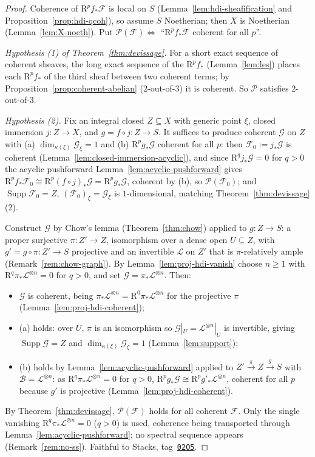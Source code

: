 \documentclass[11pt]{report}
\theoremstyle{plain}
\theoremstyle{definition}
\newcommand{\Supp}{\operatorname{Supp}}
\newcommand{\Ff}{\mathcal{F}}
\newcommand{\Gg}{\mathcal{G}}
\newcommand{\Ll}{\mathcal{L}}
\newcommand{\Bb}{\mathcal{B}}
\newcommand{\kk}{\kappa}
\newcommand{\Rr}{\mathrm{R}}
\newcommand{\stacks}[1]{\href{https://stacks.math.columbia.edu/tag/#1}{\texttt{#1}}}
\begin{document}
\begin{proof}
Coherence of $\Rr^p f_*\Ff$ is local on $S$ (Lemma~\ref{lem:hdi-sheafification}
and Proposition~\ref{prop:hdi-qcoh}), so assume $S$ Noetherian; then $X$ is
Noetherian (Lemma~\ref{lem:X-noeth}). Put
$\mathcal P(\Ff)\Leftrightarrow$ ``$\Rr^p f_*\Ff$ coherent for all $p$''.

\emph{Hypothesis (1) of Theorem~\ref{thm:devissage}.} For a short exact
sequence of coherent sheaves, the long exact sequence of the $\Rr^p f_*$
(Lemma~\ref{lem:les}) places each $\Rr^p f_*$ of the third sheaf between two
coherent terms; by Proposition~\ref{prop:coherent-abelian} (2-out-of-3) it is
coherent. So $\mathcal P$ satisfies 2-out-of-3.

\emph{Hypothesis (2).} Fix an integral closed $Z\subseteq X$ with generic
point $\xi$, closed immersion $j\colon Z\to X$, and $g=f\circ j\colon Z\to S$.
It suffices to produce coherent $\Gg$ on $Z$ with (a) $\dim_{\kk(\xi)}\Gg_\xi
=1$ and (b) $\Rr^p g_*\Gg$ coherent for all $p$: then $\Ff_0:=j_*\Gg$ is
coherent (Lemma~\ref{lem:closed-immersion-acyclic}), and since
$\Rr^q j_*\Gg=0$ for $q>0$ the acyclic pushforward
Lemma~\ref{lem:acyclic-pushforward} gives
$\Rr^p f_*\Ff_0\cong\Rr^p(f\circ j)_*\Gg=\Rr^p g_*\Gg$, coherent by (b), so
$\mathcal P(\Ff_0)$; and $\Supp\Ff_0=Z$, $(\Ff_0)_\xi=\Gg_\xi$ is
$1$-dimensional, matching Theorem~\ref{thm:devissage}(2).

Construct $\Gg$ by Chow's lemma (Theorem~\ref{thm:chow}) applied to
$g\colon Z\to S$: a proper surjective $\pi\colon Z'\to Z$, isomorphism over a
dense open $U\subseteq Z$, with $g'=g\circ\pi\colon Z'\to S$ projective and an
invertible $\Ll$ on $Z'$ that is $\pi$-relatively ample
(Remark~\ref{rem:chow-graph}). By Lemma~\ref{lem:proj-hdi-vanish} choose
$n\ge1$ with $\Rr^q\pi_*\Ll^{\otimes n}=0$ for $q>0$, and set
$\Gg=\pi_*\Ll^{\otimes n}$. Then:
\begin{itemize}
\item $\Gg$ is coherent, being $\pi_*\Ll^{\otimes n}=\Rr^0\pi_*\Ll^{\otimes n}$
for the projective $\pi$ (Lemma~\ref{lem:proj-hdi-coherent});
\item (a) holds: over $U$, $\pi$ is an isomorphism so
$\Gg|_U=\Ll^{\otimes n}|_U$ is invertible, giving $\Supp\Gg=Z$ and
$\dim_{\kk(\xi)}\Gg_\xi=1$ (Lemma~\ref{lem:support});
\item (b) holds by Lemma~\ref{lem:acyclic-pushforward} applied to
$Z'\xrightarrow{\pi}Z\xrightarrow{g}S$ with $\Bb=\Ll^{\otimes n}$: as
$\Rr^q\pi_*\Ll^{\otimes n}=0$ for $q>0$,
$\Rr^p g_*\Gg\cong\Rr^p g'_*\Ll^{\otimes n}$, coherent for all $p$ because
$g'$ is projective (Lemma~\ref{lem:proj-hdi-coherent}).
\end{itemize}

By Theorem~\ref{thm:devissage}, $\mathcal P(\Ff)$ holds for all coherent
$\Ff$. Only the single vanishing $\Rr^q\pi_*\Ll^{\otimes n}=0$ ($q>0$) is
used, coherence being transported through
Lemma~\ref{lem:acyclic-pushforward}; no spectral sequence appears
(Remark~\ref{rem:no-ss}). Faithful to Stacks, tag~\stacks{02O5}.
\end{proof}
\end{document}
